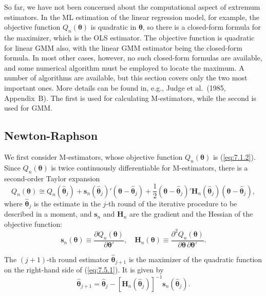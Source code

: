 
So far, we have not been concerned about the computational aspect of extremum estimators. In the ML estimation of the linear regression model, for example, the objective function $Q_n(\bm{\theta})$ is quadratic in $\bm{\theta}$, so there is a closed-form formula for the maximizer, which is the OLS estimator. The objective function is quadratic for linear GMM also, with the linear GMM estimator being the closed-form formula. In most other cases, however, no such closed-form formulas are available, and some numerical algorithm must be employed to locate the maximum. A number of algorithms are available, but this section covers only the two most important ones. More details can be found in, e.g., Judge et al.\ (1985, Appendix~B). The first is used for calculating M-estimators, while the second is used for GMM.

\subsection*{Newton-Raphson}

We first consider M-estimators, whose objective function $Q_n(\bm{\theta})$ is (\ref{eq:7.1.2}). Since $Q_n(\bm{\theta})$ is twice continuously differentiable for M-estimators, there is a second-order Taylor expansion
\begin{equation}
\label{eq:7.5.1}
Q_n(\bm{\theta}) \cong Q_n(\hat{\bm{\theta}}_j) + \mathbf{s}_n(\hat{\bm{\theta}}_j)'(\bm{\theta} - \hat{\bm{\theta}}_j) + \frac{1}{2}(\bm{\theta} - \hat{\bm{\theta}}_j)'\mathbf{H}_n(\hat{\bm{\theta}}_j)(\bm{\theta} - \hat{\bm{\theta}}_j),
\end{equation}
where $\hat{\bm{\theta}}_j$ is the estimate in the $j$-th round of the iterative procedure to be described in a moment, and $\mathbf{s}_n$ and $\mathbf{H}_n$ are the gradient and the Hessian of the objective function:
\begin{equation}
\label{eq:7.5.2}
\mathbf{s}_n(\bm{\theta}) \equiv \frac{\partial Q_n(\bm{\theta})}{\partial\bm{\theta}'}, \quad \mathbf{H}_n(\bm{\theta}) \equiv \frac{\partial^2 Q_n(\bm{\theta})}{\partial\bm{\theta}\,\partial\bm{\theta}'}.
\end{equation}

The $(j+1)$-th round estimator $\hat{\bm{\theta}}_{j+1}$ is the maximizer of the quadratic function on the right-hand side of (\ref{eq:7.5.1}). It is given by
\begin{equation}
\label{eq:7.5.3}
\hat{\bm{\theta}}_{j+1} = \hat{\bm{\theta}}_j - [\mathbf{H}_n(\hat{\bm{\theta}}_j)]^{-1}\mathbf{s}_n(\hat{\bm{\theta}}_j).
\end{equation}

